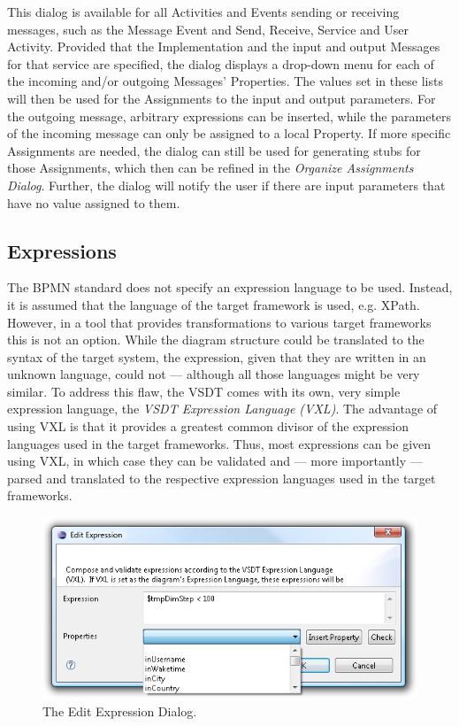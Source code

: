 This dialog is available for all Activities and Events sending or receiving
messages, such as the Message Event and Send, Receive, Service and User Activity.
Provided that the Implementation and the input and output Messages for that
service are specified, the dialog displays a drop-down menu for each of the
incoming and/or outgoing Messages' Properties.  The values set in these lists
will then be used for the Assignments to the input and output parameters.  For
the outgoing message, arbitrary expressions can be inserted, while the parameters
of the incoming message can only be assigned to a local Property.  If more specific
Assignments are needed, the dialog can still be used for generating stubs for
those Assignments, which then can be refined in the \emph{Organize Assignments
Dialog}.  Further, the dialog will notify the user if there are input parameters
that have no value assigned to them.



\subsection{Expressions}
\label{sec:user_features_exp}

The BPMN standard does not specify an expression language to be used.  Instead,
it is assumed that the language of the target framework is used, e.g.  XPath.
However, in a tool that provides transformations to various target frameworks
this is not an option.  While the diagram structure could be translated to the
syntax of the target system, the expression, given that they are written in an
unknown language, could not --- although all those languages might be very similar.
To address this flaw, the VSDT comes with its own, very simple expression language,
the \emph{VSDT Expression Language (VXL)}.  The advantage of using VXL is that it
provides a greatest common divisor of the expression languages used in the target
frameworks.  Thus, most expressions can be given using VXL, in which case they
can be validated and --- more importantly --- parsed and translated to the
respective expression languages used in the target frameworks.

\begin{figure}[ht]
	\centering
	\includegraphics[width=.5\textwidth]{figures/features/editExp.png}
	\caption{The Edit Expression Dialog.}
	\label{fig:editExp}
\end{figure}

